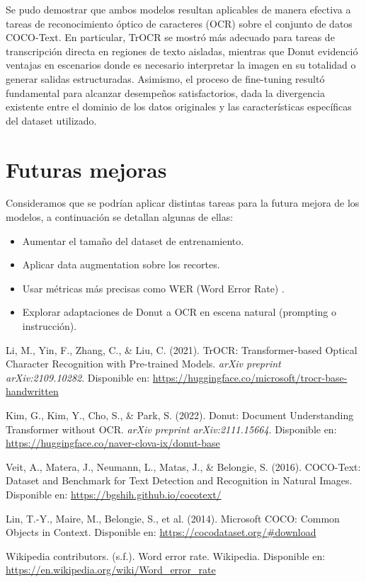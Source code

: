 \documentclass[12pt]{article}
\begin{document}
Se pudo demostrar que ambos modelos resultan aplicables de manera efectiva a tareas de 
reconocimiento óptico de caracteres (OCR) sobre el conjunto de datos COCO-Text. En particular,
TrOCR se mostró más adecuado para tareas de transcripción directa en regiones de texto 
aisladas, mientras que Donut evidenció ventajas en escenarios donde es necesario interpretar 
la imagen en su totalidad o generar salidas estructuradas.
Asimismo, el proceso de fine-tuning resultó fundamental para alcanzar desempeños 
satisfactorios, dada la divergencia existente entre el dominio de los datos originales y
las características específicas del dataset utilizado.

\section{Futuras mejoras}

Consideramos que se podrían aplicar distintas tareas para la futura mejora de los modelos, a continuación
se detallan algunas de ellas:

\begin{itemize}
    \item Aumentar el tamaño del dataset de entrenamiento.
    \item Aplicar data augmentation sobre los recortes.
    \item Usar métricas más precisas como WER (Word Error Rate) \cite{wer}.
    \item Explorar adaptaciones de Donut a OCR en escena natural (prompting o instrucción).
\end{itemize}

\begin{thebibliography}{9}

Li, M., Yin, F., Zhang, C., \& Liu, C. (2021). TrOCR: Transformer-based Optical Character Recognition with Pre-trained Models. \textit{arXiv preprint arXiv:2109.10282}.  
Disponible en: \url{https://huggingface.co/microsoft/trocr-base-handwritten}

Kim, G., Kim, Y., Cho, S., \& Park, S. (2022). Donut: Document Understanding Transformer without OCR. \textit{arXiv preprint arXiv:2111.15664}.  
Disponible en: \url{https://huggingface.co/naver-clova-ix/donut-base}

Veit, A., Matera, J., Neumann, L., Matas, J., \& Belongie, S. (2016). COCO-Text: Dataset and Benchmark for Text Detection and Recognition in Natural Images.  
Disponible en: \url{https://bgshih.github.io/cocotext/}

Lin, T.-Y., Maire, M., Belongie, S., et al. (2014). Microsoft COCO: Common Objects in Context.  
Disponible en: \url{https://cocodataset.org/#download}

Wikipedia contributors. (s.f.). Word error rate. Wikipedia.  
Disponible en: \url{https://en.wikipedia.org/wiki/Word_error_rate}

\end{thebibliography}
\end{document}
